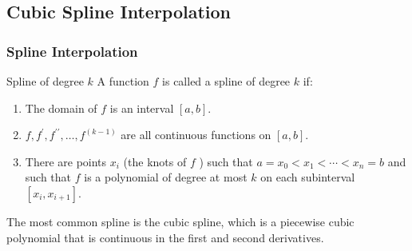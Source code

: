 \documentclass{beamer}
\begin{document}
\subsection[Cubic Spline Interpolation]{Cubic Spline Interpolation}
\begin{frame}
  \frametitle{Spline Interpolation}
  \begin{block}{Spline of degree $k$}
    A function $f$ is called a spline of degree $k$ if:
    \begin{enumerate}
    \item The domain of $f$ is an interval $[a, b]$.
    \item $f, f^{\prime}, f^{\prime \prime}, \ldots, f^{(k-1)}$ are all continuous functions on $[a, b]$.
    \item There are points $x_i$ (the knots of $f$ ) such that $a=x_0<x_1<\cdots<x_n=b$ and such that $f$ is a polynomial of degree at most $k$ on each subinterval $\left[x_i, x_{i+1}\right]$.
  \end{enumerate}
  \end{block}
  The most common spline is the \alert{cubic spline}, which is a piecewise cubic polynomial that is continuous in the first and second derivatives.
\end{frame}
\end{document}
